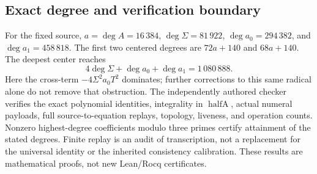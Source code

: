 \subsection{Exact degree and verification boundary}
For the fixed source, $a=\deg A=16\,384$,
$\deg\Sigma=81\,922$, $\deg a_0=294\,382$, and
$\deg a_1=458\,818$. The first two centered degrees are
$72a+140$ and $68a+140$. The deepest center reaches
\[
 4\deg\Sigma+\deg a_0+\deg a_1=1\,080\,888.
\]
Here the cross-term $-4\Sigma^2a_0T^2$ dominates; further corrections to
this same radical alone do not remove that obstruction.
The independently authored checker verifies the exact polynomial
identities, integrality in $\operatorname{halfA}$, actual numeral payloads,
full source-to-equation replays, topology, liveness, and operation counts.
Nonzero highest-degree coefficients modulo three primes certify attainment
of the stated degrees. Finite replay is an audit of transcription, not a
replacement for the universal identity or the inherited consistency
calibration. These results are mathematical proofs, not new Lean/Rocq
certificates.
